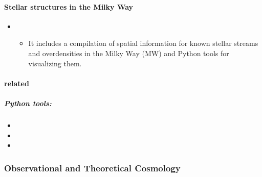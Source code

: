 \documentclass[letterpaper,10pt,english]{sphinxmanual}
\begin{document}
\paragraph{Stellar structures in the Milky Way}
\label{\detokenize{resource/astro/topics/galactic_astronomy:stellar-structures-in-the-milky-way}}\begin{itemize}
\item {} 
\begin{itemize}
\item {} 
It includes a compilation of spatial information for known stellar
streams and overdensities in the Milky Way (MW) and Python tools
for visualizing them.

\end{itemize}

\end{itemize}


\paragraph{ related}
\label{\detokenize{resource/astro/topics/galactic_astronomy:gaia-related}}

\subparagraph{Python tools:}
\label{\detokenize{resource/astro/topics/galactic_astronomy:python-tools}}\begin{itemize}
\item {} 

\item {} 

\item {} 

\end{itemize}


\subsubsection{Observational and Theoretical Cosmology}
\label{\detokenize{resource/astro/topics/cosmology_tools:observational-and-theoretical-cosmology}}\label{\detokenize{resource/astro/topics/cosmology_tools::doc}}
\end{document}
